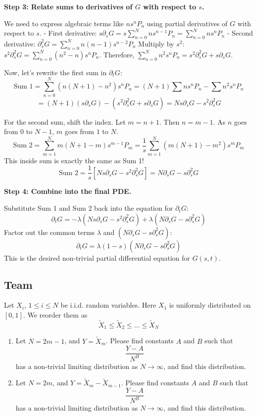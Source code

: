 \begin{solution}
\textbf{Step 3: Relate sums to derivatives of $G$ with respect to $s$.}

We need to express algebraic terms like $n s^n P_n$ using partial derivatives of $G$ with respect to $s$.
- First derivative: $s \partial_s G = s \sum_{n=0}^N n s^{n-1} P_n = \sum_{n=0}^N n s^n P_n$
- Second derivative: $\partial_s^2 G = \sum_{n=0}^N n(n-1) s^{n-2} P_n$
Multiply by $s^2$: $s^2 \partial_s^2 G = \sum_{n=0}^N (n^2 - n) s^n P_n$.
Therefore, $\sum_{n=0}^N n^2 s^n P_n = s^2 \partial_s^2 G + s \partial_s G$.

Now, let's rewrite the first sum in $\partial_t G$:
\[ \text{Sum 1} = \sum_{n=0}^N (n(N+1) - n^2) s^n P_n = (N+1) \sum n s^n P_n - \sum n^2 s^n P_n \]
\[ = (N+1) (s \partial_s G) - (s^2 \partial_s^2 G + s \partial_s G) = N s \partial_s G - s^2 \partial_s^2 G \]

For the second sum, shift the index. Let $m = n+1$. Then $n = m-1$. As $n$ goes from $0$ to $N-1$, $m$ goes from $1$ to $N$.
\[ \text{Sum 2} = \sum_{m=1}^N m (N+1-m) s^{m-1} P_m = \frac{1}{s} \sum_{m=1}^N (m(N+1) - m^2) s^m P_m \]
This inside sum is exactly the same as Sum 1!
\[ \text{Sum 2} = \frac{1}{s} \left[ N s \partial_s G - s^2 \partial_s^2 G \right] = N \partial_s G - s \partial_s^2 G \]

\textbf{Step 4: Combine into the final PDE.}

Substitute Sum 1 and Sum 2 back into the equation for $\partial_t G$:
\[ \partial_t G = -\lambda (N s \partial_s G - s^2 \partial_s^2 G) + \lambda (N \partial_s G - s \partial_s^2 G) \]
Factor out the common terms $\lambda$ and $(N \partial_s G - s \partial_s^2 G)$:
\[ \partial_t G = \lambda (1 - s) \left( N \partial_s G - s \partial_s^2 G \right) \]
This is the desired non-trivial partial differential equation for $G(s,t)$.
\end{solution}


\subsection{Team}

\begin{exercise}\label{probability:2018:6}
Let $X_i$, $1 \leq i \leq N$ be i.i.d. random variables. Here $X_1$ is uniformly distributed on $[0, 1]$. We reorder them as
\[
\tilde{X}_1 \leq \tilde{X}_2 \leq \dots \leq \tilde{X}_N
\]
\begin{enumerate}
    \item[(a)] Let $N = 2m - 1$, and $Y = \tilde{X}_m$. Please find constants $A$ and $B$ such that
    \[
    \frac{Y - A}{N^B}
    \]
    has a non-trivial limiting distribution as $N \to \infty$, and find this distribution.
    \item[(b)] Let $N = 2m$, and $Y = \tilde{X}_m - \tilde{X}_{m-1}$. Please find constants $A$ and $B$ such that
    \[
    \frac{Y - A}{N^B}
    \]
    has a non-trivial limiting distribution as $N \to \infty$, and find this distribution.
\end{enumerate}
\end{exercise}

